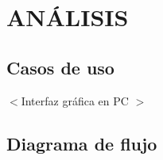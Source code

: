 \chapter{ANÁLISIS}
\section{Casos de uso}

$<$Interfaz gráfica en PC $>$

\section{Diagrama de flujo}
